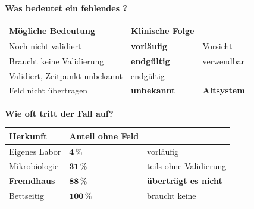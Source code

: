 \begin{merksatz}
\textbf{Was bedeutet ein fehlendes ?}

\begin{center}
{\small
\renewcommand{\arraystretch}{1.5}
\begin{tabular}{@{}P{3.4cm}P{2.2cm}P{2.4cm}@{}}
\toprule
\textbf{Mögliche Bedeutung} & \textbf{Klinische Folge} & \\
\midrule
Noch nicht validiert & \textbf{vorläufig} & \textcolor{mittel}{Vorsicht}\\
Braucht keine Validierung & \textbf{endgültig} & \textcolor{gruen}{verwendbar}\\
Validiert, Zeitpunkt unbekannt & endgültig & \\
Feld nicht übertragen & \textcolor{akzent}{\textbf{unbekannt}} & \textcolor{akzent}{\textbf{Altsystem}}\\
\bottomrule
\end{tabular}}
\end{center}

\begin{center}
\begin{minipage}{0.88\textwidth}
\end{minipage}
\end{center}

\textbf{Wie oft tritt der Fall auf?}

\begin{center}
\renewcommand{\arraystretch}{1.45}
\begin{tabular}{@{}P{2.8cm}P{2.2cm}P{2.6cm}@{}}
\toprule
\textbf{Herkunft} & \textbf{Anteil ohne Feld} & \\
\midrule
Eigenes Labor & $\mathbf{4\,\%}$ & \textcolor{gruen}{vorläufig}\\
Mikrobiologie & $\mathbf{31\,\%}$ & \textcolor{mittel}{teils ohne Validierung}\\
\textbf{Fremdhaus} & \textcolor{akzent}{$\mathbf{88\,\%}$} & \textcolor{akzent}{\textbf{überträgt es nicht}}\\
Bettseitig & $\mathbf{100\,\%}$ & \textcolor{gruen}{braucht keine}\\
\bottomrule
\end{tabular}
\end{center}

\begin{center}
\end{center}
\end{merksatz}

